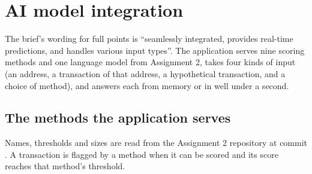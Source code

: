 \section{AI model integration}
\label{sec:model}

The brief's wording for full points is ``seamlessly integrated, provides real-time predictions,
and handles various input types''. The application serves nine scoring methods and one language
model from Assignment 2, takes four kinds of input (an address, a transaction of that address, a
hypothetical transaction, and a choice of method), and answers each from memory or in well under a
second.

\subsection{The methods the application serves}
\label{sec:methods}

Names, thresholds and sizes are read from the Assignment 2 repository at commit . A
transaction is flagged by a method when it can be scored and its score reaches that method's
threshold.

